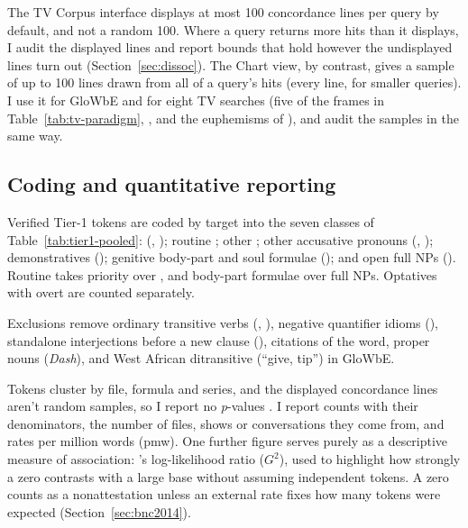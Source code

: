 \documentclass[12pt]{article}
\begin{document}
The TV Corpus interface displays at most 100 concordance lines per query by default, and not a random 100. Where a query returns more hits than it displays, I audit the displayed lines and report bounds that hold however the undisplayed lines turn out (Section~\ref{sec:dissoc}). The Chart view, by contrast, gives a sample of up to 100 lines drawn from all of a query's hits (every line, for smaller queries). I use it for GloWbE and for eight TV searches (five of the frames in Table~\ref{tab:tv-paradigm}, ,  and the euphemisms of ), and audit the samples in the same way.

\subsection{Coding and quantitative reporting}
\label{sec:coding}

Verified Tier-1 tokens are coded by target into the seven classes of Table~\ref{tab:tier1-pooled}:  (, ); routine ; other ; other accusative pronouns (, ); demonstratives (); genitive body-part and soul formulae (); and open full NPs (). Routine  takes priority over , and body-part formulae over full NPs. Optatives with overt  are counted separately.

Exclusions remove ordinary transitive verbs (, ), negative quantifier idioms (), standalone interjections before a new clause (), citations of the word, proper nouns (\emph{Dash}), and West African ditransitive  (\enquote{give, tip}) in GloWbE.

Tokens cluster by file, formula and series, and the displayed concordance lines aren't random samples, so I report no \emph{p}-values \citep{kilgarriff2005}. I report counts with their denominators, the number of files, shows or conversations they come from, and rates per million words (pmw). One further figure serves purely as a descriptive measure of association: \textcite{dunning1993}'s log-likelihood ratio ($G^2$), used to highlight how strongly a zero contrasts with a large base without assuming independent tokens. A zero counts as a nonattestation unless an external rate fixes how many tokens were expected (Section~\ref{sec:bnc2014}).
\end{document}
